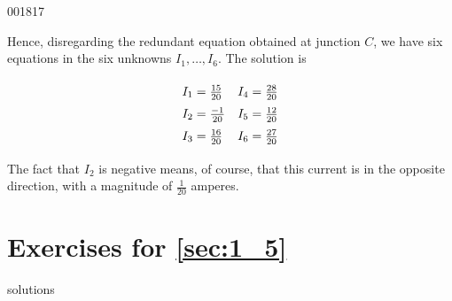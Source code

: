 \begin{example}{}{001817}
\begin{solution}
Hence, disregarding the redundant equation obtained at junction $C$, we have six equations in the six unknowns $I_1, \dots, I_6$. The solution is

\begin{equation*}
\def\arraystretch{1.5}
\begin{array}{ll}
	I_1 = \frac{15}{20} & I_4 = \frac{28}{20} \\
	I_2 = \frac{-1}{20} & I_5 = \frac{12}{20} \\
	I_3 = \frac{16}{20} & I_6 = \frac{27}{20}
\end{array}
\end{equation*}

The fact that $I_2$ is negative means, of course, that this current is in the opposite direction, with a magnitude of $\frac{1}{20}$ amperes.

\end{solution}

\end{example}

\vspace*{-2em}
\section*{Exercises for \ref{sec:1_5}}

\begin{Filesave}{solutions}
\end{Filesave}

